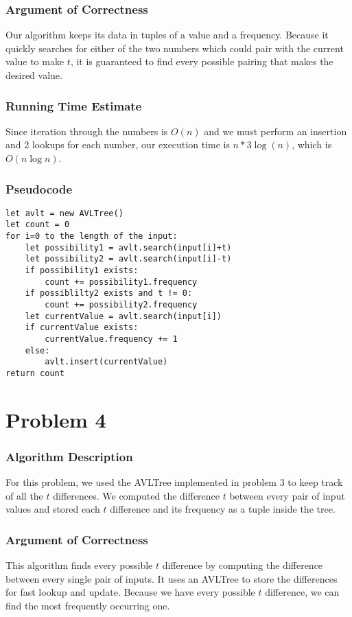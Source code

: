 \documentclass{math}
\begin{document}
\subsubsection*{Argument of Correctness}
Our algorithm keeps its data in tuples of a value and a frequency. Because it
quickly searches for either of the two numbers which could pair with the
current value to make \( t \), it is guaranteed to find every possible pairing
that makes the desired value.

\subsubsection*{Running Time Estimate} Since iteration through the numbers is
\( O(n) \) and we must perform an insertion and 2 lookups for each number, our
execution time is \( n*3\log(n) \), which is \( O(n\log n) \).

\subsubsection*{Pseudocode}
\begin{lstlisting}
let avlt = new AVLTree()
let count = 0
for i=0 to the length of the input:
    let possibility1 = avlt.search(input[i]+t)
    let possibility2 = avlt.search(input[i]-t)
    if possibility1 exists:
        count += possibility1.frequency
    if possiblilty2 exists and t != 0:
        count += possibility2.frequency
    let currentValue = avlt.search(input[i])
    if currentValue exists:
        currentValue.frequency += 1
    else:
        avlt.insert(currentValue)
return count
\end{lstlisting}

\section*{Problem 4}

\subsubsection*{Algorithm Description}
For this problem, we used the AVLTree implemented in problem 3 to keep track
of all the \( t \) differences. We computed the difference \( t \) between every
pair of input values and stored each \( t \) difference and its frequency as
a tuple inside the tree.

\subsubsection*{Argument of Correctness}
This algorithm finds every possible \( t \) difference by computing the
difference between every single pair of inputs. It uses an AVLTree to store the
differences for fast lookup and update. Because we have every possible \( t \)
difference, we can find the most frequently occurring one.
\end{document}
